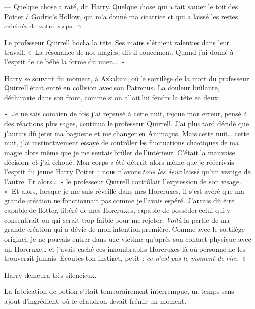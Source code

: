 --- Quelque chose a raté, dit Harry.
Quelque chose qui a fait sauter le toit des Potter à Godric's Hollow, qui m'a donné ma cicatrice et qui a laissé les restes calcinés de votre corps.~»

Le professeur Quirrell hocha la tête.
Ses mains s'étaient ralenties dans leur travail.
«~La résonance de nos magies, dit-il doucement.
Quand j'ai donné à l'esprit de ce bébé la forme du mien…~»

Harry se souvint du moment, à Azkaban, où le sortilège de la mort du professeur Quirrell était entré en collision avec son Patronus.
La douleur brûlante, déchirante dans son front, comme si on allait lui fendre la tête en deux.

«~Je ne sais combien de fois j'ai repensé à cette nuit, rejoué mon erreur, pensé à des réactions plus sages, continua le professeur Quirrell.
J'ai plus tard décidé que j'aurais dû jeter ma baguette et me changer en Animagus.
Mais cette nuit… cette nuit, j'ai instinctivement essayé de contrôler les fluctuations chaotiques de ma magie alors même que je me sentais brûler de l'intérieur.
C'était la mauvaise décision, et j'ai échoué.
Mon corps a été détruit alors même que je réécrivais l'esprit du jeune Harry Potter~; nous n'avons \emph{tous les deux} laissé qu'un vestige de l'autre.
Et alors…~»
le professeur Quirrell contrôlait l'expression de son visage.
«~Et alors, lorsque je me suis réveillé dans mes Horcruxes, il s'est avéré que ma grande création ne fonctionnait pas comme je l'avais espéré.
J'aurais dû être capable de flotter, libéré de mes Horcruxes, capable de posséder celui qui y consentirait ou qui serait trop faible pour me rejeter.
\emph{Voilà} la partie de ma grande création qui a dévié de mon intention première.
Comme avec le sortilège originel, je ne pouvais entrer dans une victime qu'après son contact physique avec un Horcruxe… et j'avais caché ces innombrables Horcruxes là où personne ne les trouverait jamais.
Écoutes ton instinct, petit~: \emph{ce n'est pas le moment de rire}.~»

Harry demeura très silencieux.

La fabrication de potion s'était temporairement interrompue, un temps sans ajout d'ingrédient, où le chaudron devait frémir un moment.

